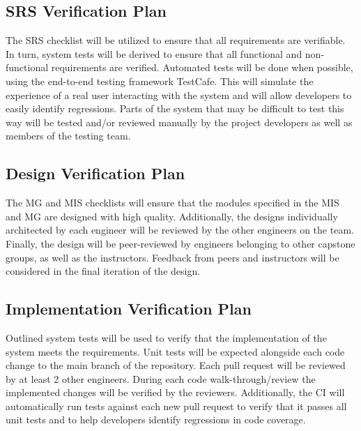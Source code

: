 \documentclass[12pt, titlepage]{article}
\begin{document}
\subsection{SRS Verification Plan}

The SRS checklist will be utilized to ensure that all requirements are verifiable. In turn, system tests will be derived to ensure that all functional and non-functional requirements are verified. Automated tests will be done when possible, using the end-to-end testing framework TestCafe. This will simulate the experience of a real user interacting with the system and will allow developers to easily identify regressions. Parts of the system that may be difficult to test this way will be tested and/or reviewed manually by the project developers as well as members of the testing team.


\subsection{Design Verification Plan}

The MG and MIS checklists will ensure that the modules specified in the MIS and MG are designed with high quality. Additionally, the designs individually architected by each engineer will be reviewed by the other engineers on the team. Finally, the design will be peer-reviewed by engineers belonging to other capstone groups, as well as the instructors. Feedback from peers and instructors will be considered in the final iteration of the design.




\subsection{Implementation Verification Plan}

Outlined system tests will be used to verify that the implementation of the system meets the requirements. Unit tests will be expected alongside each code change to the main branch of the repository. Each pull request will be reviewed by at least 2 other engineers. During each code walk-through/review the implemented changes will be verified by the reviewers. Additionally, the CI will automatically run tests against each new pull request to verify that it passes all unit tests and to help developers identify regressions in code coverage.
\end{document}
